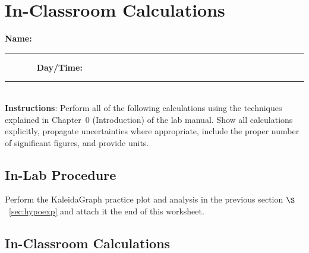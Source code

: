 \vfill
\pagebreak

\renewcommand{\thesection}{\thechapter.W1}

\section{In-Classroom Calculations}
{\bf \Large Name:}~ \rule{5cm}{.1mm}~~~~~~~
{\bf \Large Day/Time:}~\rule{3cm}{.1mm}\\

\noindent
{\bf Instructions}: Perform all of the following 
calculations using the techniques explained in 
Chapter~0 (Introduction) of the lab manual. Show all calculations explicitly, 
propagate uncertainties where appropriate, include the proper number of 
significant figures, and provide units. 

\subsection{In-Lab Procedure}

Perform the KaleidaGraph practice plot and analysis in the previous
section $\S$~\ref{sec:hypoexp} and attach it the end of this worksheet.

\subsection{In-Classroom Calculations}


